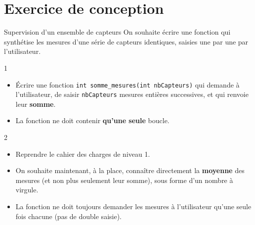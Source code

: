 \section{Exercice de conception}

\begin{UPSTIexercice}{Supervision d'un ensemble de capteurs}
    On souhaite écrire une fonction qui synthétise les mesures d'une série de capteurs identiques, saisies une par une par l'utilisateur.

    \begin{UPSTICahierDesCharges}{1}
        \begin{itemize}
            \item Écrire une fonction \texttt{int somme\_mesures(int nbCapteurs)} qui demande à l'utilisateur, de saisir \texttt{nbCapteurs} mesures entières successives, et qui renvoie leur \textbf{somme}.
            \item La fonction ne doit contenir \textbf{qu'une seule} boucle.
        \end{itemize}
    \end{UPSTICahierDesCharges}


    \begin{UPSTICahierDesCharges}{2}
        \begin{itemize}
            \item Reprendre le cahier des charges de niveau 1.
            \item On souhaite maintenant, à la place, connaître directement la \textbf{moyenne} des mesures (et non plus seulement leur somme), sous forme d'un nombre à virgule.
            \item La fonction ne doit toujours demander les mesures à l'utilisateur qu'une seule fois chacune (pas de double saisie).
        \end{itemize}
    \end{UPSTICahierDesCharges}

\end{UPSTIexercice}

